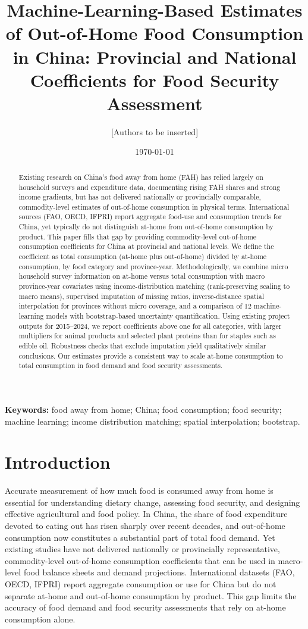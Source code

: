 \documentclass[12pt,a4paper]{article}
\title{Machine-Learning-Based Estimates of Out-of-Home Food Consumption in China: Provincial and National Coefficients for Food Security Assessment}
\author{[Authors to be inserted]}
\date{\today}
\begin{document}
\maketitle

\begin{abstract}
Existing research on China’s food away from home (FAH) has relied largely on household surveys and expenditure data, documenting rising FAH shares and strong income gradients, but has not delivered nationally or provincially comparable, commodity-level estimates of out-of-home consumption in physical terms. International sources (FAO, OECD, IFPRI) report aggregate food-use and consumption trends for China, yet typically do not distinguish at-home from out-of-home consumption by product. This paper fills that gap by providing commodity-level out-of-home consumption coefficients for China at provincial and national levels. We define the coefficient as total consumption (at-home plus out-of-home) divided by at-home consumption, by food category and province-year. Methodologically, we combine micro household survey information on at-home versus total consumption with macro province-year covariates using income-distribution matching (rank-preserving scaling to macro means), supervised imputation of missing ratios, inverse-distance spatial interpolation for provinces without micro coverage, and a comparison of 12 machine-learning models with bootstrap-based uncertainty quantification. Using existing project outputs for 2015--2024, we report coefficients above one for all categories, with larger multipliers for animal products and selected plant proteins than for staples such as edible oil. Robustness checks that exclude imputation yield qualitatively similar conclusions. Our estimates provide a consistent way to scale at-home consumption to total consumption in food demand and food security assessments.
\end{abstract}

\noindent\textbf{Keywords:} food away from home; China; food consumption; food security; machine learning; income distribution matching; spatial interpolation; bootstrap.

\section{Introduction}
\label{sec:introduction}

Accurate measurement of how much food is consumed away from home is essential for understanding dietary change, assessing food security, and designing effective agricultural and food policy. In China, the share of food expenditure devoted to eating out has risen sharply over recent decades, and out-of-home consumption now constitutes a substantial part of total food demand. Yet existing studies have not delivered nationally or provincially representative, commodity-level out-of-home consumption coefficients that can be used in macro-level food balance sheets and demand projections. International datasets (FAO, OECD, IFPRI) report aggregate consumption or use for China but do not separate at-home and out-of-home consumption by product. This gap limits the accuracy of food demand and food security assessments that rely on at-home consumption alone.
\end{document}
